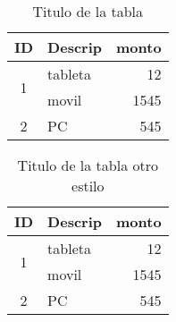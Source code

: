 
\begin{table}[h]
  \centering
  \caption{Titulo de la tabla}
  \label{tab:tablaprecios}
  \begin{tabular}{clr}
  \hline
  \textbf{ID} & \textbf{Descrip} & \textbf{monto} \\
  \hline
  \multirow{2}{*}{1} & tableta & 12 \\
                     & movil   & 1545 \\
         2           & PC      & 545\\
  \hline
  \end{tabular}
  \end{table}


  \begin{table}[h]
    \centering
    \caption{Titulo de la tabla otro estilo}
    \label{tab:tabla2}
    \begin{tabular}{clr}
      \toprule
    \textbf{ID} & \textbf{Descrip} & \textbf{monto} \\
    \midrule
    \multirow{2}{*}{1} & tableta & 12 \\
                       & movil   & 1545 \\
           2           & PC      & 545\\
           \bottomrule
    \end{tabular}
    \end{table}
